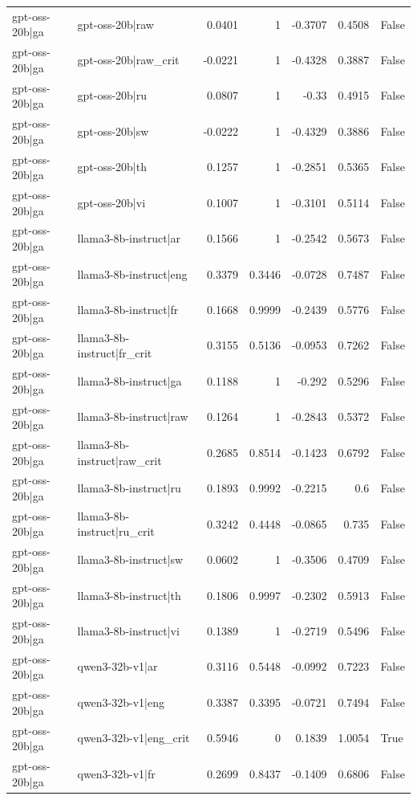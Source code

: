 \begin{table}
\begin{tabular}{l l r r r r l}
gpt-oss-20b|ga & gpt-oss-20b|raw & 0.0401 & 1 & -0.3707 & 0.4508 & False \\
gpt-oss-20b|ga & gpt-oss-20b|raw_crit & -0.0221 & 1 & -0.4328 & 0.3887 & False \\
gpt-oss-20b|ga & gpt-oss-20b|ru & 0.0807 & 1 & -0.33 & 0.4915 & False \\
gpt-oss-20b|ga & gpt-oss-20b|sw & -0.0222 & 1 & -0.4329 & 0.3886 & False \\
gpt-oss-20b|ga & gpt-oss-20b|th & 0.1257 & 1 & -0.2851 & 0.5365 & False \\
gpt-oss-20b|ga & gpt-oss-20b|vi & 0.1007 & 1 & -0.3101 & 0.5114 & False \\
gpt-oss-20b|ga & llama3-8b-instruct|ar & 0.1566 & 1 & -0.2542 & 0.5673 & False \\
gpt-oss-20b|ga & llama3-8b-instruct|eng & 0.3379 & 0.3446 & -0.0728 & 0.7487 & False \\
gpt-oss-20b|ga & llama3-8b-instruct|fr & 0.1668 & 0.9999 & -0.2439 & 0.5776 & False \\
gpt-oss-20b|ga & llama3-8b-instruct|fr_crit & 0.3155 & 0.5136 & -0.0953 & 0.7262 & False \\
gpt-oss-20b|ga & llama3-8b-instruct|ga & 0.1188 & 1 & -0.292 & 0.5296 & False \\
gpt-oss-20b|ga & llama3-8b-instruct|raw & 0.1264 & 1 & -0.2843 & 0.5372 & False \\
gpt-oss-20b|ga & llama3-8b-instruct|raw_crit & 0.2685 & 0.8514 & -0.1423 & 0.6792 & False \\
gpt-oss-20b|ga & llama3-8b-instruct|ru & 0.1893 & 0.9992 & -0.2215 & 0.6 & False \\
gpt-oss-20b|ga & llama3-8b-instruct|ru_crit & 0.3242 & 0.4448 & -0.0865 & 0.735 & False \\
gpt-oss-20b|ga & llama3-8b-instruct|sw & 0.0602 & 1 & -0.3506 & 0.4709 & False \\
gpt-oss-20b|ga & llama3-8b-instruct|th & 0.1806 & 0.9997 & -0.2302 & 0.5913 & False \\
gpt-oss-20b|ga & llama3-8b-instruct|vi & 0.1389 & 1 & -0.2719 & 0.5496 & False \\
gpt-oss-20b|ga & qwen3-32b-v1|ar & 0.3116 & 0.5448 & -0.0992 & 0.7223 & False \\
gpt-oss-20b|ga & qwen3-32b-v1|eng & 0.3387 & 0.3395 & -0.0721 & 0.7494 & False \\
gpt-oss-20b|ga & qwen3-32b-v1|eng_crit & 0.5946 & 0 & 0.1839 & 1.0054 & True \\
gpt-oss-20b|ga & qwen3-32b-v1|fr & 0.2699 & 0.8437 & -0.1409 & 0.6806 & False \\

\end{tabular}
\end{table}
